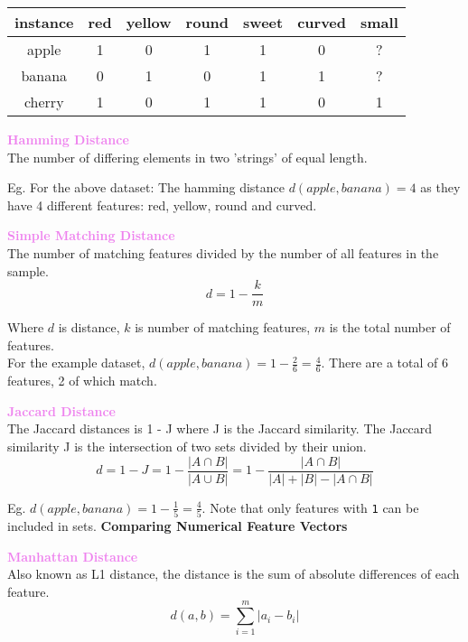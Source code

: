 \documentclass[a4paper,10pt]{article}
\begin{document}
\begin{center}
	\begin{tabular}{ |c|c|c|c|c|c|c| }
		\hline 
		instance &red &yellow &round &sweet &curved &small \\
		\hline 
		apple &1 &0 &1 &1 &0 &? \\
		banana &0 &1 &0 &1 &1 &? \\
		cherry &1 &0 &1 &1 &0 &1 \\
		\hline
	\end{tabular}
\end{center}
\begin{shaded}
	\noindent \textcolor{Violet}{\textbf{Hamming Distance}}\\
	The number of differing elements in two 'strings' of equal length.
\end{shaded}
\noindent Eg. For the above dataset: 
The hamming distance $d(apple, banana) = 4$ as they have 4 different features: red, yellow, round and curved.
\begin{shaded}
	\noindent \textcolor{Violet}{\textbf{Simple Matching Distance}}\\
	The number of matching features divided by the number of all features in the sample. 
	\begin{equation*}
		d = 1 - \frac{k}{m}
	\end{equation*}
\end{shaded}
\noindent Where $d$ is distance, $k$ is number of matching features, $m$ is the total number of features. \\
For the example dataset, $d(apple, banana) = 1 - \frac{2}{6} = \frac{4}{6}.$ There are a total of 6 features, 2 of which match.  
\begin{shaded}
	\noindent \textcolor{Violet}{\textbf{Jaccard Distance}}\\
	The Jaccard distances is 1 - J where J is the Jaccard similarity. The Jaccard similarity J is the intersection of two sets divided by their union. 
	\begin{equation*}
		d = 1 - J = 1 - \frac{|A \cap B|}{|A \cup B|} = 1 - \frac{|A \cap B|}{|A| + |B| - |A \cap B|}
	\end{equation*}
\end{shaded}
\noindent Eg. $d(apple, banana) = 1 - \frac{1}{5} = \frac{4}{5}$. Note that only features with \texttt{1} can be included in sets. 
\newpage
\noindent \textcolor{Periwinkle}{\textbf{Comparing Numerical Feature Vectors}}
\begin{shaded}
	\noindent \textcolor{Violet}{\textbf{Manhattan Distance}}\\
	Also known as L1 distance, the distance is the sum of absolute differences of each feature. 
	\begin{equation*}
		d(a,b) = \sum_{i=1}^{m}|a_{i} - b_{i}|
	\end{equation*}
\end{shaded}
\end{document}
